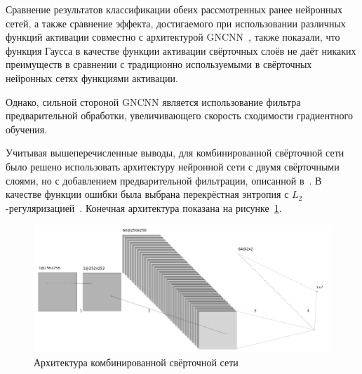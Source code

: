 Сравнение результатов классификации обеих рассмотренных ранее нейронных сетей, а также сравнение эффекта, достигаемого при использовании различных функций активации совместно с архитектурой GNCNN~\cite{Qian2017}, также показали, что функция Гаусса в качестве функции активации свёрточных слоёв не даёт никаких преимуществ в сравнении с традиционно используемыми в свёрточных нейронных сетях функциями активации.

Однако, сильной стороной GNCNN является использование фильтра предварительной обработки, увеличивающего скорость сходимости градиентного обучения.

Учитывая вышеперечисленные выводы, для комбинированной свёрточной сети было решено использовать архитектуру нейронной сети с двумя свёрточными слоями, но с добавлением предварительной фильтрации, описанной в~\cite{GNCNN}. В качестве функции ошибки была выбрана перекрёстная энтропия с $ L_2 $-регуляризацией~\cite{Tikhonov}. Конечная архитектура показана на рисунке~\ref{fig:MixedCNNArchitecture}.

\begin{figure}[!htb]
\centering
\includegraphics[width=1\textwidth]{include/graphics/mixed_gray_architecture}
\caption{Архитектура комбинированной свёрточной сети}
\label{fig:MixedCNNArchitecture}
\end{figure}

\clearpage
